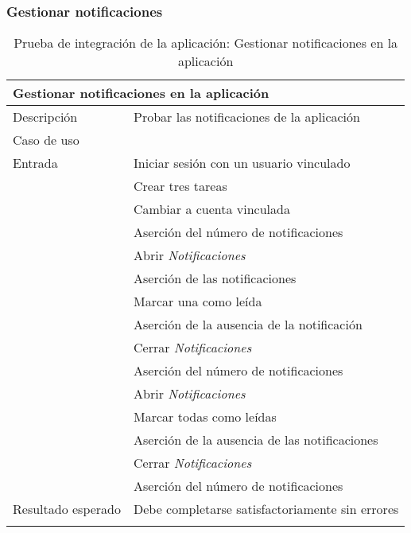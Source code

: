\newpage
\subsubsection{Gestionar notificaciones}

\begin{longtable}{|p{} p{}|}
    \hline
    \multicolumn{2}{|l|}{\textbf{Gestionar notificaciones en la aplicación}} \\ \hline 
    Descripción                 & Probar las notificaciones de la aplicación \\ \hline
    Caso de uso                 & \nameref{cu:consultar_notificaciones} \\ \hline
    Entrada                     & Iniciar sesión con un usuario vinculado \\
                                & Crear tres tareas \\ 
                                & Cambiar a cuenta vinculada \\
                                & Aserción del número de notificaciones \\
                                & Abrir \emph{Notificaciones} \\ 
                                & Aserción de las notificaciones \\
                                & Marcar una como leída \\
                                & Aserción de la ausencia de la notificación \\
                                & Cerrar \emph{Notificaciones} \\
                                & Aserción del número de notificaciones \\
                                & Abrir \emph{Notificaciones} \\ 
                                & Marcar todas como leídas \\
                                & Aserción de la ausencia de las notificaciones \\
                                & Cerrar \emph{Notificaciones} \\
                                & Aserción del número de notificaciones \\
                                \hline
    Resultado esperado          & Debe completarse satisfactoriamente sin errores \\ \hline
    \caption{Prueba de integración de la aplicación: Gestionar notificaciones en la aplicación}
    \label{cp:i:app:gestionar_notificaciones}
\end{longtable}

